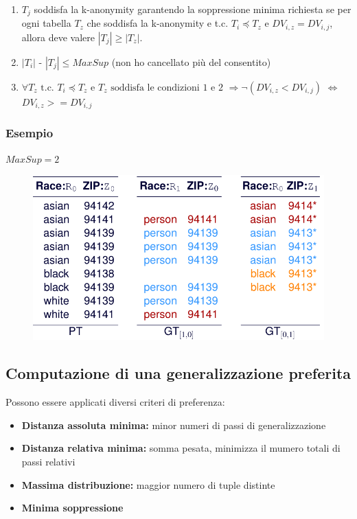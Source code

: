 \documentclass{report}
\begin{document}
\begin{enumerate}
    \item \( T_j \) soddisfa la k-anonymity garantendo la soppressione minima richiesta se per ogni tabella \( T_z \) che soddisfa la k-anonymity e t.c. \( T_i \preceq T_z \) e \( DV_{i,z} = DV_{i,j} \), allora deve valere \( |T_j| \geq |T_z| \).
    \item \( |T_i| \text{ - } |T_j| \leq MaxSup \) (non ho cancellato più del consentito)
    \item \( \forall T_z \text{ t.c. } T_i \preceq T_z \text{ e } T_z \text{ soddisfa le condizioni 1 e 2 } \Rightarrow \neg(DV_{i,z} < DV_{i,j}) \) $ \iff $ \(DV_{i,z} >= DV_{i,j} \)
\end{enumerate}

\subsubsection{Esempio}
$MaxSup = 2$
\begin{figure}[ht]
    \centering
    \includegraphics[width=1\linewidth]{images/k-minimal.png}
\end{figure}

\subsection{Computazione di una generalizzazione preferita}
Possono essere applicati diversi criteri di preferenza:
\begin{itemize}
    \item \textbf{Distanza assoluta minima:} minor numeri di passi di generalizzazione
    \item \textbf{Distanza relativa minima:} somma pesata, minimizza il mumero totali di passi relativi
    \item \textbf{Massima distribuzione:} maggior numero di tuple distinte
    \item \textbf{Minima soppressione} 
\end{itemize}
\end{document}
